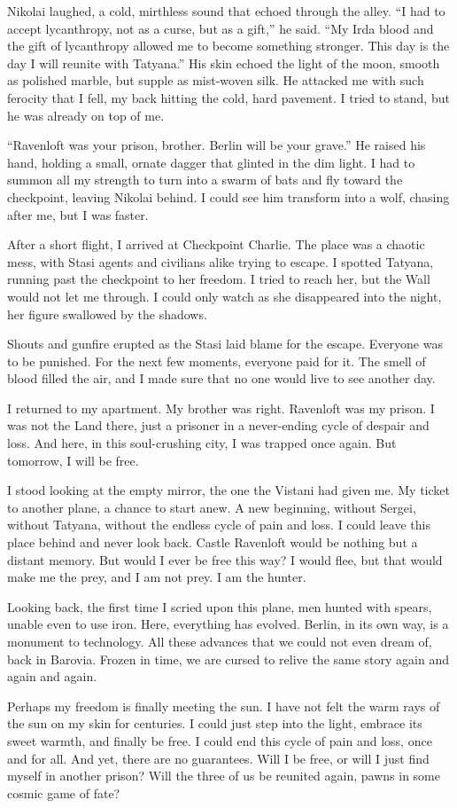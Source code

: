 Nikolai laughed, a cold, mirthless sound that echoed through the alley.
``I had to accept lycanthropy, not as a curse, but as a gift,'' he said.
``My Irda blood and the gift of lycanthropy allowed me to become something stronger.
This day is the day I will reunite with Tatyana.''
His skin echoed the light of the moon, smooth as polished marble, but supple as mist-woven silk.
He attacked me with such ferocity that I fell, my back hitting the cold, hard pavement.
I tried to stand, but he was already on top of me.

``Ravenloft was your prison, brother.
Berlin will be your grave.''
He raised his hand, holding a small, ornate dagger that glinted in the dim light.
I had to summon all my strength to turn into a swarm of bats and fly toward the checkpoint, leaving Nikolai behind.
I could see him transform into a wolf, chasing after me, but I was faster.

After a short flight, I arrived at Checkpoint Charlie.
The place was a chaotic mess, with Stasi agents and civilians alike trying to escape.
I spotted Tatyana, running past the checkpoint to her freedom.
I tried to reach her, but the Wall would not let me through.
I could only watch as she disappeared into the night, her figure swallowed by the shadows.

Shouts and gunfire erupted as the Stasi laid blame for the escape.
Everyone was to be punished.
For the next few moments, everyone paid for it.
The smell of blood filled the air, and I made sure that no one would live to see another day.

I returned to my apartment.
My brother was right.
Ravenloft was my prison.
I was not the Land there, just a prisoner in a never-ending cycle of despair and loss.
And here, in this soul-crushing city, I was trapped once again.
But tomorrow, I will be free.

I stood looking at the empty mirror, the one the Vistani had given me.
My ticket to another plane, a chance to start anew.
A new beginning, without Sergei, without Tatyana, without the endless cycle of pain and loss.
I could leave this place behind and never look back.
Castle Ravenloft would be nothing but a distant memory.
But would I ever be free this way? I would flee, but that would make me the prey, and I am not prey.
I am the hunter.

Looking back, the first time I scried upon this plane, men hunted with spears, unable even to use iron.
Here, everything has evolved.
Berlin, in its own way, is a monument to technology.
All these advances that we could not even dream of, back in Barovia.
Frozen in time, we are cursed to relive the same story again and again and again.

Perhaps my freedom is finally meeting the sun.
I have not felt the warm rays of the sun on my skin for centuries.
I could just step into the light, embrace its sweet warmth, and finally be free.
I could end this cycle of pain and loss, once and for all.
And yet, there are no guarantees.
Will I be free, or will I just find myself in another prison? Will the three of us be reunited again, pawns in some cosmic game of fate?
\vfill\newpage
